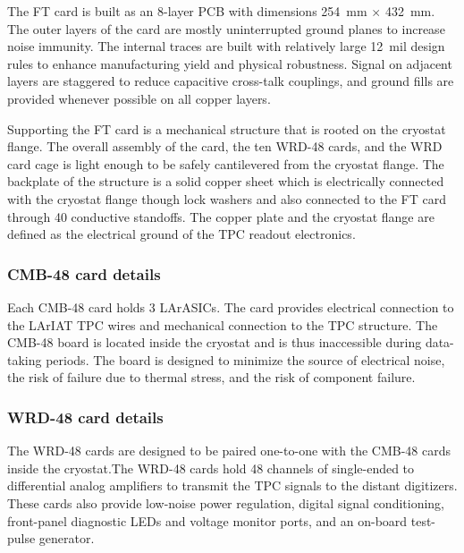 The FT card is built as an 8-layer PCB with dimensions 254~mm $\times$ 432~mm. The outer layers of the card are mostly uninterrupted ground planes to increase noise immunity. The internal traces are built with relatively large 12~mil design rules to enhance manufacturing yield and physical robustness. Signal on adjacent layers are staggered to reduce capacitive cross-talk couplings, and ground fills are provided whenever possible on all copper layers.

Supporting the FT card is a mechanical structure that is rooted on the cryostat flange. The overall assembly of the card, the ten WRD-48 cards, and the WRD card cage is light enough to be safely cantilevered from the cryostat flange. The backplate of the structure is a solid copper sheet which is electrically connected with the cryostat flange though lock washers and also connected to the FT card through 40 conductive standoffs. The copper plate and the cryostat flange are defined as the electrical ground of the TPC readout electronics.

\subsubsection*{CMB-48 card details}
Each CMB-48 card holds 3 LArASICs. The card provides electrical connection to the LArIAT TPC wires and mechanical connection to the TPC structure. The CMB-48 board is located inside the cryostat and is thus inaccessible during data-taking periods. The board is designed to minimize the source of electrical noise, the risk of failure due to thermal stress, and the risk of component failure.

\subsubsection*{WRD-48 card details}
The WRD-48 cards are designed to be paired one-to-one with the CMB-48 cards inside the cryostat.The WRD-48 cards hold 48 channels of single-ended to differential analog amplifiers to transmit the TPC signals to the distant digitizers. These cards also provide low-noise power regulation, digital signal conditioning, front-panel diagnostic LEDs and voltage monitor ports, and an on-board test-pulse generator. 

